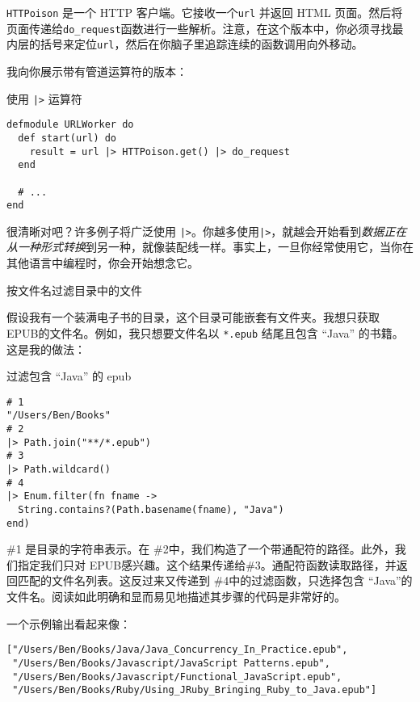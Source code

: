 \texttt{HTTPoison} 是一个 HTTP 客户端。它接收一个\texttt{url} 并返回 HTML 页面。然后将页面传递给\texttt{do\_request}函数进行一些解析。注意，在这个版本中，你必须寻找最内层的括号来定位\texttt{url}，然后在你脑子里追踪连续的函数调用向外移动。

我向你展示带有管道运算符的版本：

\begin{code}{使用 \texttt{|>} 运算符}
\begin{verbatim}
defmodule URLWorker do
  def start(url) do
    result = url |> HTTPoison.get() |> do_request
  end

  # ...
end
\end{verbatim}
\label{lst:use_pipe_operator}
\end{code}

很清晰对吧？许多例子将广泛使用 \texttt{|>}。你越多使用\texttt{|>}，就越会开始看到\emph{数据正在从一种形式转换}到另一种，就像装配线一样。事实上，一旦你经常使用它，当你在其他语言中编程时，你会开始想念它。


\begin{example}{按文件名过滤目录中的文件}
\end{example}

假设我有一个装满电子书的目录，这个目录可能嵌套有文件夹。我想只获取 EPUB的文件名。例如，我只想要文件名以 \texttt{*.epub}
结尾且包含 ``Java'' 的书籍。这是我的做法：

\begin{code}{过滤包含 ``Java'' 的 epub}
\begin{verbatim}
# 1
"/Users/Ben/Books"
# 2
|> Path.join("**/*.epub")
# 3
|> Path.wildcard()
# 4
|> Enum.filter(fn fname ->
  String.contains?(Path.basename(fname), "Java")
end)
\end{verbatim}
\label{lst:filter_epubs_containing_java}
\end{code}

\#1 是目录的字符串表示。在 \#2中，我们构造了一个带通配符的路径。此外，我们指定我们只对 EPUB感兴趣。这个结果传递给\#3。通配符函数读取路径，并返回匹配的文件名列表。这反过来又传递到 \#4中的过滤函数，只选择包含 ``Java''的文件名。阅读如此明确和显而易见地描述其步骤的代码是非常好的。

一个示例输出看起来像：
\begin{verbatim}
["/Users/Ben/Books/Java/Java_Concurrency_In_Practice.epub",
 "/Users/Ben/Books/Javascript/JavaScript Patterns.epub",
 "/Users/Ben/Books/Javascript/Functional_JavaScript.epub",
 "/Users/Ben/Books/Ruby/Using_JRuby_Bringing_Ruby_to_Java.epub"]
\end{verbatim}

